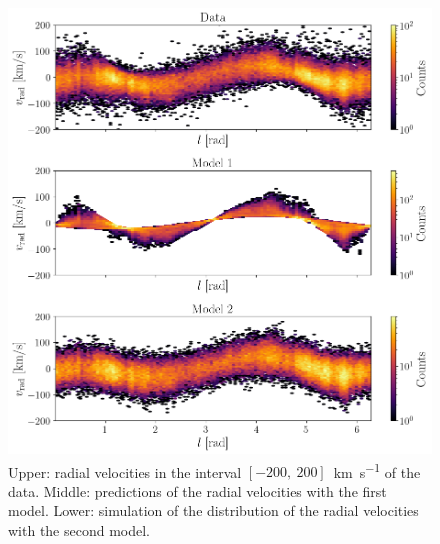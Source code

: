 \begin{figure}[H]
    \centering
    \includegraphics[width=0.95\columnwidth]{Fig/DataModelPresentation.png}
    \caption{Upper: radial velocities in the interval $[-200,~200]$~\unit{\kilo\meter\per\second} of the data. Middle: predictions of the radial velocities with the first model. Lower: simulation of the distribution of the radial velocities with the second model.}
    \label{fig:DataModelPresentation}
\end{figure}